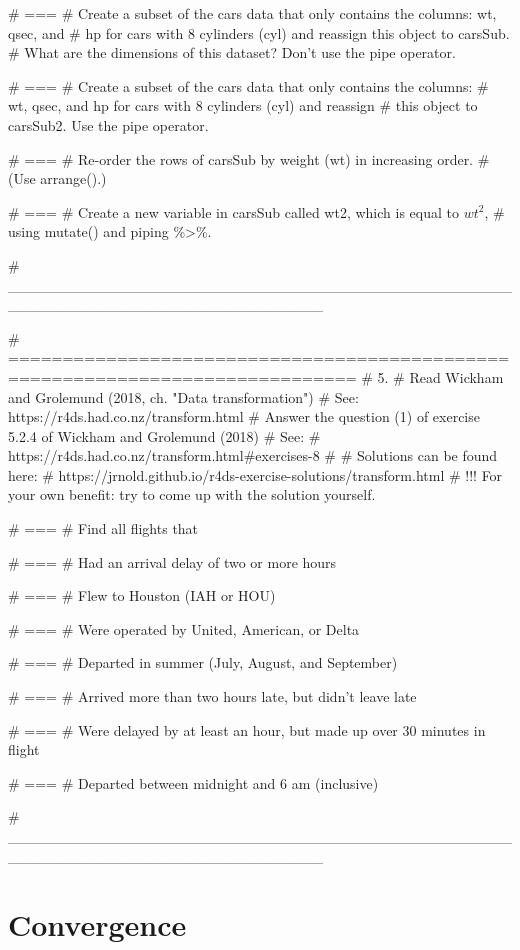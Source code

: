 \begin{rblock1}
# ===
# Create a subset of the cars data that only contains the columns: wt, qsec, and
# hp for cars with 8 cylinders (cyl) and reassign this object to carsSub. 
# What are the dimensions of this dataset? Don't use the pipe operator.


# ===
# Create a subset of the cars data that only contains the columns: 
# wt, qsec, and hp for cars with 8 cylinders (cyl) and reassign 
# this object to carsSub2. Use the pipe operator.


# ===
# Re-order the rows of carsSub by weight (wt) in increasing order. 
# (Use arrange().)


# ===
# Create a new variable in carsSub called wt2, which is equal to $wt^2$, 
# using mutate() and piping \%>\%.

# ______________________________________________________________________________



# ==============================================================================
# 5. 
# Read Wickham and Grolemund (2018, ch. "Data transformation") 
# See: https://r4ds.had.co.nz/transform.html
# Answer the question (1) of exercise 5.2.4 of Wickham and Grolemund (2018)
# See: 
# https://r4ds.had.co.nz/transform.html#exercises-8
# 
# Solutions can be found here:
# https://jrnold.github.io/r4ds-exercise-solutions/transform.html
# !!! For your own benefit: try to come up with the solution yourself. 

# ===
# Find all flights that


# ===
# Had an arrival delay of two or more hours


# ===
# Flew to Houston (IAH or HOU)


# ===
# Were operated by United, American, or Delta


# ===
# Departed in summer (July, August, and September)


# ===
# Arrived more than two hours late, but didn’t leave late


# ===
# Were delayed by at least an hour, but made up over 30 minutes in flight


# ===
# Departed between midnight and 6 am (inclusive)

# ______________________________________________________________________________

\end{rblock1}

\section{Convergence}\label{sec:convergence}

